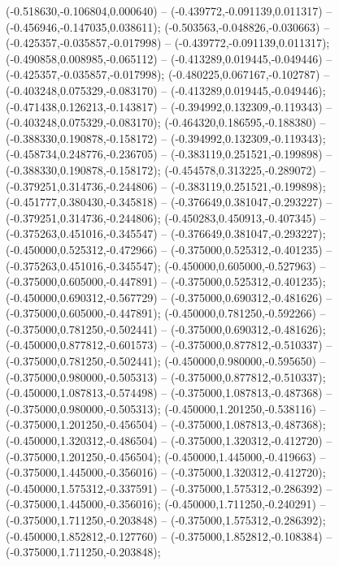  (-0.518630,-0.106804,0.000640) -- (-0.439772,-0.091139,0.011317) -- (-0.456946,-0.147035,0.038611);
 (-0.503563,-0.048826,-0.030663) -- (-0.425357,-0.035857,-0.017998) -- (-0.439772,-0.091139,0.011317);
 (-0.490858,0.008985,-0.065112) -- (-0.413289,0.019445,-0.049446) -- (-0.425357,-0.035857,-0.017998);
 (-0.480225,0.067167,-0.102787) -- (-0.403248,0.075329,-0.083170) -- (-0.413289,0.019445,-0.049446);
 (-0.471438,0.126213,-0.143817) -- (-0.394992,0.132309,-0.119343) -- (-0.403248,0.075329,-0.083170);
 (-0.464320,0.186595,-0.188380) -- (-0.388330,0.190878,-0.158172) -- (-0.394992,0.132309,-0.119343);
 (-0.458734,0.248776,-0.236705) -- (-0.383119,0.251521,-0.199898) -- (-0.388330,0.190878,-0.158172);
 (-0.454578,0.313225,-0.289072) -- (-0.379251,0.314736,-0.244806) -- (-0.383119,0.251521,-0.199898);
 (-0.451777,0.380430,-0.345818) -- (-0.376649,0.381047,-0.293227) -- (-0.379251,0.314736,-0.244806);
 (-0.450283,0.450913,-0.407345) -- (-0.375263,0.451016,-0.345547) -- (-0.376649,0.381047,-0.293227);
 (-0.450000,0.525312,-0.472966) -- (-0.375000,0.525312,-0.401235) -- (-0.375263,0.451016,-0.345547);
 (-0.450000,0.605000,-0.527963) -- (-0.375000,0.605000,-0.447891) -- (-0.375000,0.525312,-0.401235);
 (-0.450000,0.690312,-0.567729) -- (-0.375000,0.690312,-0.481626) -- (-0.375000,0.605000,-0.447891);
 (-0.450000,0.781250,-0.592266) -- (-0.375000,0.781250,-0.502441) -- (-0.375000,0.690312,-0.481626);
 (-0.450000,0.877812,-0.601573) -- (-0.375000,0.877812,-0.510337) -- (-0.375000,0.781250,-0.502441);
 (-0.450000,0.980000,-0.595650) -- (-0.375000,0.980000,-0.505313) -- (-0.375000,0.877812,-0.510337);
 (-0.450000,1.087813,-0.574498) -- (-0.375000,1.087813,-0.487368) -- (-0.375000,0.980000,-0.505313);
 (-0.450000,1.201250,-0.538116) -- (-0.375000,1.201250,-0.456504) -- (-0.375000,1.087813,-0.487368);
 (-0.450000,1.320312,-0.486504) -- (-0.375000,1.320312,-0.412720) -- (-0.375000,1.201250,-0.456504);
 (-0.450000,1.445000,-0.419663) -- (-0.375000,1.445000,-0.356016) -- (-0.375000,1.320312,-0.412720);
 (-0.450000,1.575312,-0.337591) -- (-0.375000,1.575312,-0.286392) -- (-0.375000,1.445000,-0.356016);
 (-0.450000,1.711250,-0.240291) -- (-0.375000,1.711250,-0.203848) -- (-0.375000,1.575312,-0.286392);
 (-0.450000,1.852812,-0.127760) -- (-0.375000,1.852812,-0.108384) -- (-0.375000,1.711250,-0.203848);
